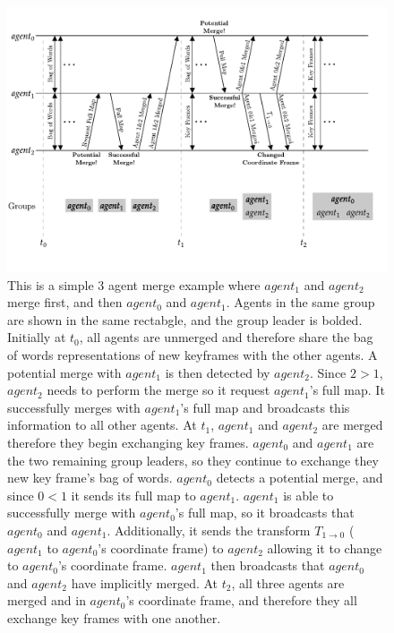\begin{figure}[h]
    \centering
    \includegraphics[]{figures/3_agent_merge.pdf}

    \caption{This is a simple 3 agent merge example where $agent_1$ and $agent_2$ merge first, and then $agent_0$ and $agent_1$. Agents in the same group are shown in the same rectabgle, and the group leader is bolded. \captionbreak Initially at $t_0$, all agents are unmerged and therefore share the bag of words representations of new keyframes with the other agents. A potential merge with $agent_1$ is then detected by $agent_2$. Since $2>1$, $agent_2$ needs to perform the merge so it request $agent_1$'s full map. It successfully merges with $agent_1$'s full map and broadcasts this information to all other agents. \captionbreak At $t_1$, $agent_1$ and $agent_2$ are merged therefore they begin exchanging key frames. $agent_0$ and $agent_1$ are the two remaining group leaders, so they continue to exchange they new key frame's bag of words. $agent_0$ detects a potential merge, and since $0<1$ it sends its full map to $agent_1$. $agent_1$ is able to successfully merge with $agent_0$'s full map, so it broadcasts that $agent_0$ and $agent_1$. Additionally, it sends the transform $T_{1 \to 0}$ ($agent_1$ to $agent_0$'s coordinate frame) to $agent_2$ allowing it to change to $agent_0$'s coordinate frame. $agent_1$ then broadcasts that $agent_0$ and $agent_2$ have implicitly merged. \captionbreak At $t_2$, all three agents are merged and in $agent_0$'s coordinate frame, and therefore they all exchange key frames with one another.}
    \label{fig:3-agent-merge}
\end{figure}

